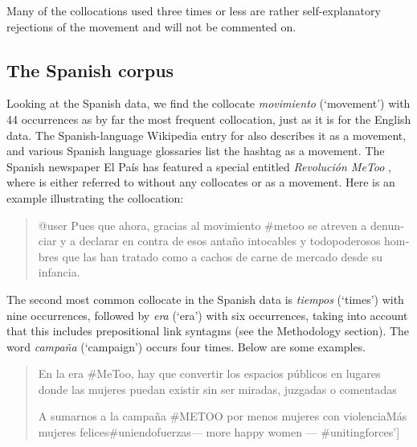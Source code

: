 \documentclass[output=paper,english,spanish,german,english]{langsci/langscibook}
\begin{document}
\noindent Many of the collocations used three times or less are rather self-explanatory rejections of the \mt movement and will not be commented on.

\subsection{The Spanish corpus}

Looking at the Spanish data, we find the collocate \textit{movimiento} (`movement') with 44 occurrences as by far the most frequent collocation, just as it is for the English data. The Spanish-language Wikipedia entry for \mt also describes it as a movement, and various Spanish language glossaries list the hashtag as a movement. The Spanish newspaper El País has featured a special entitled \textit{Revolución MeToo} \parencite{elpais18}, where \mt is either referred to without any collocates or as a movement. Here is an example illustrating the collocation:

\begin{quote}\sffamily
  \foreignlanguage{spanish}{@user Pues que ahora, gracias al movimiento  \#metoo se atreven a denunciar y a declarar en contra de esos antaño intocables y todopoderosos hombres que las han tratado como a cachos de carne de mercado desde su infancia.}
\end{quote}

\noindent The second most common collocate in the Spanish data is \textit{tiempos} (`times') with nine occurrences, followed by \textit{era} (`era') with six occurrences, taking into account that this includes prepositional link syntagms (see the Methodology section). The word \textit{campaña} (`campaign') occurs four times. Below are some examples.

\begin{quote}\sffamily
  \foreignlanguage{spanish}{En la era \#MeToo, hay que convertir los espacios públicos en lugares donde las mujeres puedan existir sin ser miradas, juzgadas o comentadas}

  \foreignlanguage{spanish}{A sumarnos a la campaña \#METOO por menos mujeres con violencia\newline Más mujeres felices\newline \#uniendofuerzas}\newline [`Let's join the \#METOO campaign for fewer women with violence [sic] --- more happy women --- \#unitingforces']
\end{quote}
\end{document}
